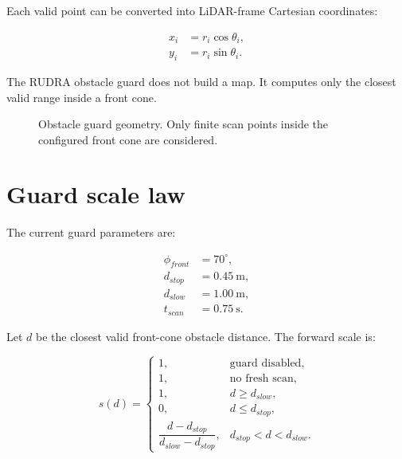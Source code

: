 Each valid point can be converted into LiDAR-frame Cartesian coordinates:

\begin{align}
x_i &= r_i\cos\theta_i,\\
y_i &= r_i\sin\theta_i.
\end{align}

The RUDRA obstacle guard does not build a map. It computes only the closest valid range inside a front cone.

\begin{figure}[htbp]
\centering
{}
\caption{Obstacle guard geometry. Only finite scan points inside the configured front cone are considered.}
\end{figure}

\section{Guard scale law}

The current guard parameters are:

\begin{align}
\phi_{front} &= 70^\circ,\\
d_{stop} &= 0.45\ \text{m},\\
d_{slow} &= 1.00\ \text{m},\\
t_{scan} &= 0.75\ \text{s}.
\end{align}

Let \(d\) be the closest valid front-cone obstacle distance. The forward scale is:

\begin{equation}
s(d)=
\begin{cases}
1, & \text{guard disabled},\\
1, & \text{no fresh scan},\\
1, & d \ge d_{slow},\\
0, & d \le d_{stop},\\
\dfrac{d-d_{stop}}{d_{slow}-d_{stop}}, & d_{stop}<d<d_{slow}.
\end{cases}
\end{equation}

